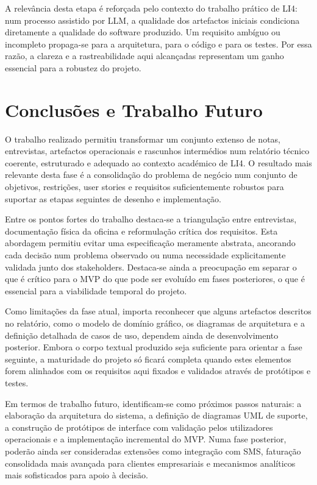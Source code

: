 \documentclass[a4paper,12pt]{scrreprt}
\begin{document}
        A relevância desta etapa é reforçada pelo contexto do trabalho prático de LI4: num processo assistido por LLM, a qualidade dos artefactos iniciais condiciona diretamente a qualidade do software produzido. Um requisito ambíguo ou incompleto propaga-se para a arquitetura, para o código e para os testes. Por essa razão, a clareza e a rastreabilidade aqui alcançadas representam um ganho essencial para a robustez do projeto.


\chapter{Conclusões e Trabalho Futuro}
    O trabalho realizado permitiu transformar um conjunto extenso de notas, entrevistas, artefactos operacionais e rascunhos intermédios num relatório técnico coerente, estruturado e adequado ao contexto académico de LI4. O resultado mais relevante desta fase é a consolidação do problema de negócio num conjunto de objetivos, restrições, user stories e requisitos suficientemente robustos para suportar as etapas seguintes de desenho e implementação.

    Entre os pontos fortes do trabalho destaca-se a triangulação entre entrevistas, documentação física da oficina e reformulação crítica dos requisitos. Esta abordagem permitiu evitar uma especificação meramente abstrata, ancorando cada decisão num problema observado ou numa necessidade explicitamente validada junto dos stakeholders. Destaca-se ainda a preocupação em separar o que é crítico para o MVP do que pode ser evoluído em fases posteriores, o que é essencial para a viabilidade temporal do projeto.

    Como limitações da fase atual, importa reconhecer que alguns artefactos descritos no relatório, como o modelo de domínio gráfico, os diagramas de arquitetura e a definição detalhada de casos de uso, dependem ainda de desenvolvimento posterior. Embora o corpo textual produzido seja suficiente para orientar a fase seguinte, a maturidade do projeto só ficará completa quando estes elementos forem alinhados com os requisitos aqui fixados e validados através de protótipos e testes.

    Em termos de trabalho futuro, identificam-se como próximos passos naturais: a elaboração da arquitetura do sistema, a definição de diagramas UML de suporte, a construção de protótipos de interface com validação pelos utilizadores operacionais e a implementação incremental do MVP. Numa fase posterior, poderão ainda ser consideradas extensões como integração com SMS, faturação consolidada mais avançada para clientes empresariais e mecanismos analíticos mais sofisticados para apoio à decisão.
\end{document}
